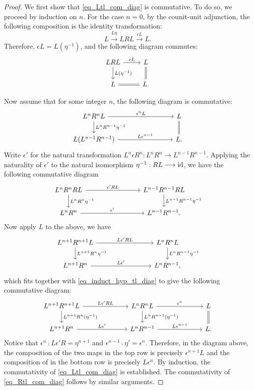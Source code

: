 \begin{proof}
We first show that \eqref{eq_Ltl_com_diag} is commutative.
To do so, we proceed by induction on $n$. For the case $n = 0$, 
by the counit-unit adjunction, the following composition is
the identity transformation:
\[
L \stackrel{L\eta}{\to} LRL \stackrel{\epsilon L}{\to} 
   L.
\]
Therefore, $\epsilon L = L(\eta^{-1})$, and the
following diagram commutes:
\[
\begin{tikzcd}
LRL \arrow{r}{\epsilon L} \arrow{d}{L(\eta^{-1})} &
L \arrow[equals]{d} \\
L \arrow[equals]{r} & L.
\end{tikzcd}
\]

Now assume that for some integer $n$, the following diagram is 
commutative:
\begin{equation}\label{eq_induct_hyp_tl_diag}
\begin{tikzcd}[column sep=80pt]
L^{n}R^{n}L \arrow{r}{\epsilon^{n}L} \arrow{d}{L^nR^{n - 1}\eta^{-1}} &
L \arrow[equals]{d} \\
L(L^{n - 1}R^{n - 1}) \arrow{r}{L\epsilon^{n - 1}} &
L.
\end{tikzcd}
\end{equation}
Write $\epsilon'$ for the natural transformation $L^n \epsilon R^n:
L^n R^n \to L^{n - 1} R^{n - 1}$. Applying the naturality of 
$\epsilon'$ to the natural isomorphism $\eta^{-1}: RL \longrightarrow \mathrm{id}$, we 
have the following commutative diagram
\[
\begin{tikzcd}[column sep=80pt]
L^n R^n RL \arrow{r}{\epsilon'RL} 
   \arrow{d}{L^nR^n \eta^{-1}} &
L^{n - 1}R^{n - 1} RL
   \arrow{d}{L^{n - 1}R^{n - 1}\eta^{-1}} \\
L^nR^n \arrow{r}{\epsilon'} &
L^{n - 1}R^{n - 1}.
\end{tikzcd}
\]
Now apply $L$ to the above, we have
\[
\begin{tikzcd}[column sep=80pt]
L^{n + 1} R^{n + 1} L \arrow{r}{L\epsilon'RL} 
   \arrow{d}{L^{n + 1}R^n \eta^{-1}} &
L^{n}R^n L \arrow{d}{L^nR^{n - 1}\eta^{-1}} \\
L^{n + 1}R^n \arrow{r}{L\epsilon'} &
L^{n}R^{n - 1},
\end{tikzcd}
\]
which fits together with \eqref{eq_induct_hyp_tl_diag} to give the 
following commutative diagram:
\[
\begin{tikzcd}[column sep=65pt]
L^{n + 1} R^{n + 1} L \arrow{r}{L\epsilon' RL} 
   \arrow{d}{L^{n + 1}R^n(\eta^{-1})} &
L^{n}R^n L \arrow{d}{L^nR^{n - 1}(\eta^{-1})}
   \arrow{r}{\epsilon^{n}} &
L \arrow[equals]{d} \\
L^{n + 1}R^n \arrow{r}{L\epsilon'} &
L^{n}R^{n - 1} \arrow{r}{L\epsilon^{n - 1}} &
L.
\end{tikzcd}
\]
Notice that $\epsilon^n \comp L\epsilon'R = \eta^{n + 1}$ and 
$\epsilon^{n - 1} \comp \eta' = \epsilon^{n}$. Therefore, in the 
diagram above, the composition of the two maps in the top row
is precisely $\epsilon^{n + 1} L$ and the composition of in the
bottom row is precisely $L \epsilon^n$. By induction, the 
commutativity of \eqref{eq_Ltl_com_diag} is established. The 
commutativity of \eqref{eq_Rtl_com_diag} follows by similar 
arguments.
\end{proof}

